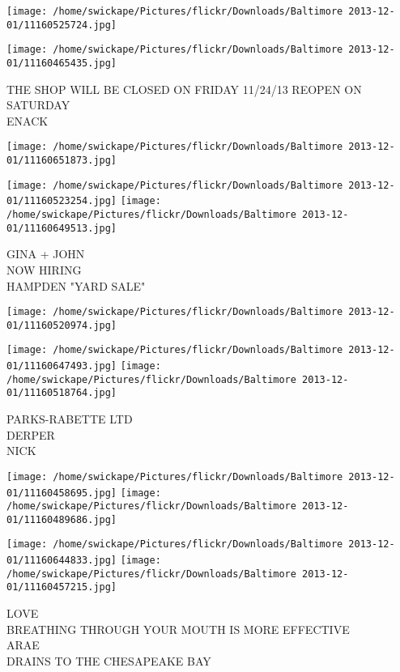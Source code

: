 \documentclass[10pt,letterpaper]{article}
\begin{document}
\texttt{[image: /home/swickape/Pictures/flickr/Downloads/Baltimore 2013-12-01/11160525724.jpg]}

\vspace{0.25in}
\texttt{[image: /home/swickape/Pictures/flickr/Downloads/Baltimore 2013-12-01/11160465435.jpg]}

THE SHOP WILL BE CLOSED ON FRIDAY 11/24/13 REOPEN ON SATURDAY\\
ENACK
\pagebreak

\texttt{[image: /home/swickape/Pictures/flickr/Downloads/Baltimore 2013-12-01/11160651873.jpg]}

\vspace{0.25in}
\texttt{[image: /home/swickape/Pictures/flickr/Downloads/Baltimore 2013-12-01/11160523254.jpg]}
\texttt{[image: /home/swickape/Pictures/flickr/Downloads/Baltimore 2013-12-01/11160649513.jpg]}

GINA + JOHN\\
NOW HIRING\\
HAMPDEN "YARD SALE"
\pagebreak

\texttt{[image: /home/swickape/Pictures/flickr/Downloads/Baltimore 2013-12-01/11160520974.jpg]}

\vspace{0.25in}
\texttt{[image: /home/swickape/Pictures/flickr/Downloads/Baltimore 2013-12-01/11160647493.jpg]}
\texttt{[image: /home/swickape/Pictures/flickr/Downloads/Baltimore 2013-12-01/11160518764.jpg]}

PARKS{-}RABETTE LTD\\
DERPER\\
NICK
\pagebreak

\texttt{[image: /home/swickape/Pictures/flickr/Downloads/Baltimore 2013-12-01/11160458695.jpg]}
\texttt{[image: /home/swickape/Pictures/flickr/Downloads/Baltimore 2013-12-01/11160489686.jpg]}

\texttt{[image: /home/swickape/Pictures/flickr/Downloads/Baltimore 2013-12-01/11160644833.jpg]}
\texttt{[image: /home/swickape/Pictures/flickr/Downloads/Baltimore 2013-12-01/11160457215.jpg]}

LOVE\\
BREATHING THROUGH YOUR MOUTH IS MORE EFFECTIVE\\
ARAE\\
DRAINS TO THE CHESAPEAKE BAY
\pagebreak
\end{document}

